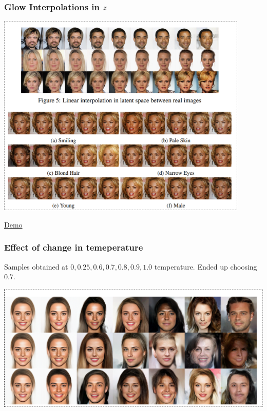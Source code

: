 \documentclass{beamer}
\begin{document}
\begin{frame}
  \frametitle{Glow Interpolations in $z$}

  \includegraphics[width=0.9\textwidth]{glow-interpolations.png}
\end{frame}

\begin{frame}
  \begin{center}
    \Huge \href{https://openai.com/blog/glow/}{Demo}
  \end{center}
\end{frame}

\begin{frame}
  \frametitle{Effect of change in temeperature}

  Samples obtained at $0, 0.25, 0.6, 0.7, 0.8, 0.9, 1.0$ temperature. Ended up choosing $0.7$.

  \includegraphics[width=1.0\textwidth]{glow-temperature-increase.png}
\end{frame}
\end{document}
